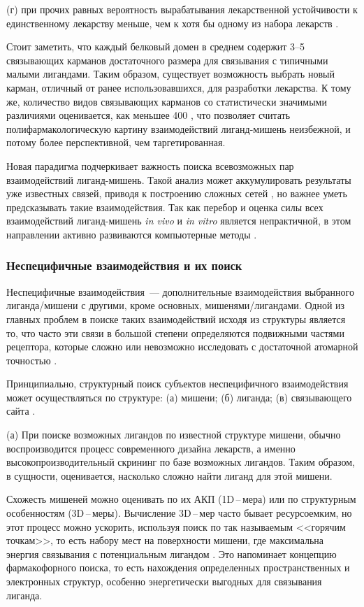 \documentclass[a4paper,14pt]{article}         %
\begin{document}
(г) при прочих равных  вероятность вырабатывания лекарственной устойчивости к единственному лекарству меньше, чем к хотя бы одному из набора лекарств \cite{Anighoro2014}.

Стоит заметить, что каждый белковый домен в среднем содержит 3--5 связывающих карманов достаточного размера для связывания с типичными малыми лигандами\cite{Skolnick2015}. Таким образом, существует возможность выбрать новый карман, отличный от ранее использовавшихся, для разработки лекарства. К тому же, количество видов связывающих карманов со статистически значимыми различиями оценивается, как меньшее 400 \cite{Skolnick2015}, что позволяет считать полифармакологическую картину взаимодействий лиганд-мишень неизбежной, и потому более перспективной, чем таргетированная.

Новая парадигма подчеркивает важность поиска всевозможных пар взаимодействий лиганд-мишень. Такой анализ может аккумулировать результаты уже известных связей, приводя к построению сложных сетей \cite{Anighoro2014}, но важнее уметь предсказывать такие взаимодействия. Так как перебор и оценка силы всех взаимодействий лиганд-мишень \textit{in vivo} и \textit{in vitro} является непрактичной, в этом направлении активно развиваются компьютерные методы \cite{Chaudhari}.

\subsubsection{Неспецифичные взаимодействия и их поиск}
Неспецифичные взаимодействия~--- дополнительные взаимодействия выбранного лиганда/мишени с другими, кроме основных, мишенями/лигандами. Одной из главных проблем в поиске таких взаимодействий исходя из структуры является то, что часто эти связи в большой степени определяются подвижными частями рецептора, которые сложно или невозможно исследовать с достаточной атомарной точностью \cite{Loving}.

Принципиально, структурный поиск субъектов неспецифичного взаимодействия может осуществляться по структуре: (а) мишени; (б) лиганда; (в) связывающего сайта \cite{Rognan2010}.

(а) При поиске возможных лигандов по известной структуре мишени, обычно воспроизводится процесс современного дизайна лекарств, а именно высокопроизводительный скрининг по базе возможных лигандов. Таким образом, в сущности, оценивается, насколько сложно найти лиганд для этой мишени. 

Схожесть мишеней можно оценивать по их АКП (1D\,--\,мера) или по структурным особенностям (3D\,--\,меры). Вычисление 3D\,--\,мер часто бывает ресурсоемким, но этот процесс можно ускорить, используя поиск по так называемым <<горячим точкам>>, то есть набору мест на поверхности мишени, где максимальна энергия связывания с потенциальным лигандом \cite{Hall2015}. Это напоминает концепцию фармакофорного поиска, то есть нахождения определенных пространственных и электронных структур, особенно энергетически выгодных для связывания лиганда.
\end{document}
